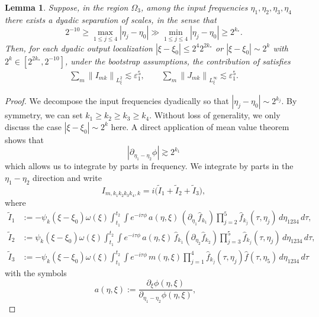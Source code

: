 \documentclass[reqno,english,11pt]{amsart}
\newcommand{\eps}{\varepsilon}
\newcommand{\snorm}[1]{\left\|#1\right\|}
\newtheorem{lemma}[theorem]{Lemma}
\theoremstyle{definition}
\numberwithin{equation}{section}
\begin{document}
\begin{lemma}\label{prop:anomalous_resonance_case_3}
Suppose, in the region $\Omega_3$, among the input frequencies $\eta_1,\eta_2,\eta_3,\eta_4$
there exists a dyadic separation of scales, in the sense that
$$2^{-10}\geq \max_{1\leq j\leq 4} |\eta_j-\eta_0|\gg\min_{1\le j\le 4} |\eta_j-\eta_0|\geq 2^{k_*}.$$
Then, for each dyadic output localization $|\xi-\xi_0|\leq 2^4 2^{2k_*}$ or
$|\xi-\xi_0|\sim 2^k$ with $2^{k}\in [2^{2k_*},2^{-10}]$, under the bootstrap assumptions, the contribution of satisfies
\begin{align}
\sum_m \snorm{I_{mk}}_{L^2_\xi} \lesssim \eps_1^5, \qquad
\sum_m \snorm{J_{mk}}_{L^\infty_\xi} \lesssim \eps_1^5.
\end{align}
\end{lemma}
\begin{proof}
We decompose the input frequencies dyadically so that $|\eta_j-\eta_0|\sim 2^{k_j}$. By symmetry, we can set  $k_1\ge k_2\ge k_3\ge k_4$. Without loss of generality, we only discuss the case $|\xi-\xi_0|\sim 2^k$ here. A direct application of mean value theorem shows that
\begin{equation}\label{eq:anomalous_resoannce_case_3_lower_bound}
    |\partial_{\eta_1-\eta_2}\phi|\gtrsim 2^{k_1}
\end{equation}
which allows us to integrate by parts in frequency. We integrate by parts in the $\eta_1-\eta_2$ direction and write
\begin{equation}\label{eqn:case3_IBP}
I_{m,k_1k_2k_3k_4,k}
=
i\bigl(\tilde I_1+\tilde I_2+\tilde I_3\bigr),
\end{equation}
where
\begin{align*}
\tilde I_1
&:=-\psi_k(\xi-\xi_0)\omega(\xi)\int_{t_1}^{t_2}\!\!\int e^{-i\tau\phi}\,a(\eta,\xi)\,(\partial_{\eta_1}\hat f_{k_1})\prod^5_{j=2}\hat f_{k_j}(\tau,\eta_j) \,d\eta_{1234}\,d\tau,\\
\tilde I_2
&:=\psi_k(\xi-\xi_0)\omega(\xi)
\int_{t_1}^{t_2}\!\!\int
e^{-i\tau\phi}\,
a(\eta,\xi)\,
\hat f_{k_1}(\partial_{\eta_2}\hat f_{k_2})\prod^5_{j=3}\hat f_{k_j}(\tau,\eta_j)
\,d\eta_{1234}\,d\tau,\\
\tilde I_3
&:=
-\psi_k(\xi-\xi_0)\omega(\xi)
\int_{t_1}^{t_2}\!\!\int
e^{-i\tau\phi}\,m(\eta,\xi) \prod_{j=1}^4 \hat f_{k_j}(\tau, \eta_j)\hat f(\tau,\eta_5)
\,d\eta_{1234}\,d\tau
\end{align*}
with the symbols
\begin{equation}\label{eqn:def_a_symbol}
a(\eta,\xi)
:=\frac{\partial_\xi\phi(\eta,\xi)}{\partial_{\eta_1-\eta_2}\phi(\eta,\xi)},\qquad

\end{equation}
\end{proof}
\end{document}
